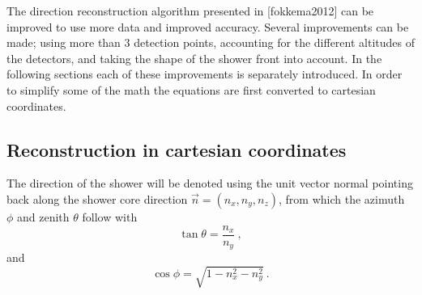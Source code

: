 The direction reconstruction algorithm presented in [fokkema2012] can be improved to use more data and improved accuracy. Several improvements can be made; using more than 3 detection points, accounting for the different altitudes of the detectors, and taking the shape of the shower front into account. In the following sections each of these improvements is separately introduced. In order to simplify some of the math the equations are first converted to cartesian coordinates.


\subsection{Reconstruction in cartesian coordinates}

The direction of the shower will be denoted using the unit vector normal pointing back along the shower core direction $\vec n = (n_x, n_y, n_z)$, from which the azimuth $\phi$ and zenith $\theta$ follow with
%
\begin{equation}
    \tan \theta = \frac{n_x}{n_y} \ ,
\end{equation}
%
and
%
\begin{equation}
    \cos \phi = \sqrt{1 - n_x^2 - n_y^2} \ .
\end{equation}


